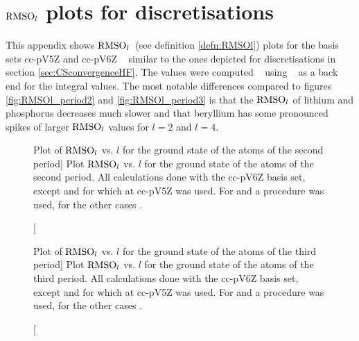 \chapter{$\text{RMSO}_l$ plots for \cGTO discretisations}
\label{apx:GaussianUHF}

This appendix shows $\text{RMSO}_l$~(see definition \vref{defn:RMSOl})
plots for the \cGTO basis sets
cc-pV5Z and cc-pV6Z%
~\cite{Dunning1989,Woon1993,Wilson1996,VanMourik2000,Prascher2011}
similar to the ones depicted for \CS discretisations
in section \vref{sec:CSconvergenceHF}.
The values were computed \molsturm~\cite{molsturmWeb,molsturmDesign}
using \libint~\cite{Libint2_231} as a back end
for the integral values.
The most notable differences compared to figures \ref{fig:RMSOl_period2}
and \vref{fig:RMSOl_period3}
is that the $\text{RMSO}_l$ of lithium and phosphorus
decreases much slower and
that beryllium has some pronounced spikes of larger $\text{RMSO}_l$
values for $l=2$ and $l=4$.

\begin{figure}[hp!]
	\centering
	\caption
	[Plot of $\text{RMSO}_l$ vs. $l$ for the \HF ground state of the atoms of the second period]
	{
		Plot $\text{RMSO}_l$ vs. $l$ for the \HF ground state
		of the atoms of the second period.
		All calculations done with the cc-pV6Z basis set,
		except  and 
		for which at cc-pV5Z was used.
		For  and  a \RHF procedure was used,
		for the other cases \UHF.
	}
	\label{fig:RMSO_period2_l}
\end{figure}

\begin{figure}[hp!]
	\centering
	\caption
	[Plot of $\text{RMSO}_l$ vs. $l$ for the \HF ground state of the atoms of the third period]
	{
		Plot $\text{RMSO}_l$ vs. $l$ for the \HF ground state
		of the atoms of the third period.
		All calculations done with the cc-pV6Z basis set,
		except  and 
		for which at cc-pV5Z was used.
		For  and  a \RHF procedure was used,
		for the other cases \UHF.
	}
	\label{fig:RMSO_period3_l}
\end{figure}

%

